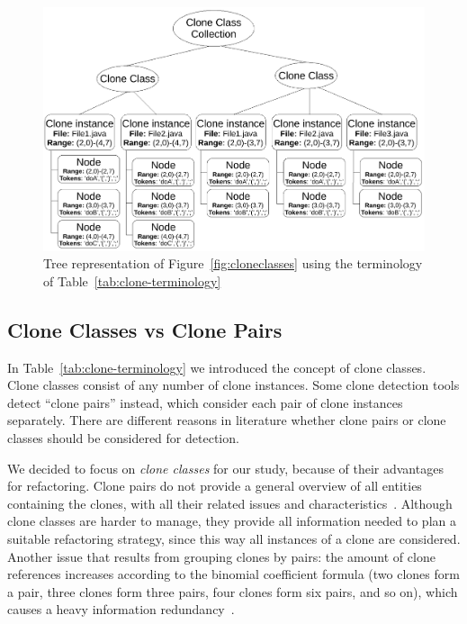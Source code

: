 \begin{figure}[H]
  \includegraphics[width=1\columnwidth]{img/TerminologyExample}
  \caption{Tree representation of Figure~\ref{fig:cloneclasses} using the terminology of Table~\ref{tab:clone-terminology}}
  \label{fig:terminologyexample}
\end{figure}

\subsection{Clone Classes vs Clone Pairs}\label{sec:classesvspairs}
In Table~\ref{tab:clone-terminology} we introduced the concept of clone classes. Clone classes consist of any number of clone instances. Some clone detection tools detect ``clone pairs'' instead, which consider each pair of clone instances separately. There are different reasons in literature whether clone pairs or clone classes should be considered for detection.

We decided to focus on \textit{clone classes} for our study, because of their advantages for refactoring. Clone pairs do not provide a general overview of all entities containing the clones, with all their related issues and characteristics~\cite{fontana2012duplicated}. Although clone classes are harder to manage, they provide all information needed to plan a suitable refactoring strategy, since this way all instances of a clone are considered. Another issue that results from grouping clones by pairs: the amount of clone references increases according to the binomial coefficient formula (two clones form a pair, three clones form three pairs, four clones form six pairs, and so on), which causes a heavy information redundancy~\cite{fontana2012duplicated}.

